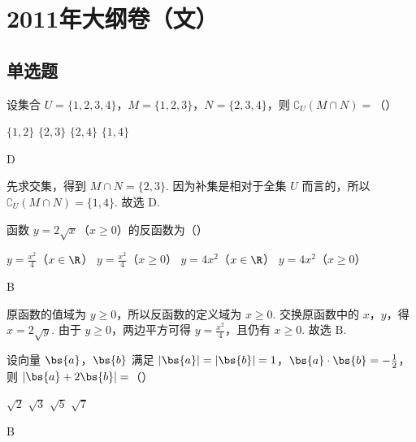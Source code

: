 \chapter{2011年大纲卷（文）}

\section{单选题}

\begin{problem}
设集合 \(U=\{1,2,3,4\}\)，\(M=\{1,2,3\}\)，\(N=\{2,3,4\}\)，则 \(\complement_U(M\cap N)=\)（\quad）

\choices
    {\(\{1,2\}\)}
    {\(\{2,3\}\)}
    {\(\{2,4\}\)}
    {\(\{1,4\}\)}
\end{problem}

\begin{answer}
D
\end{answer}

\begin{solution}
先求交集，得到 \(M\cap N=\{2,3\}\). 因为补集是相对于全集 \(U\) 而言的，所以
\(\complement_U(M\cap N)=\{1,4\}\). 故选 D.
\end{solution}

\begin{problem}
函数 \(y=2\sqrt{x}\)（\(x\geqslant0\)）的反函数为（\quad）

\choices
    {\(y=\frac{x^2}{4}\)（\(x\in\R\)）}
    {\(y=\frac{x^2}{4}\)（\(x\geqslant0\)）}
    {\(y=4x^2\)（\(x\in\R\)）}
    {\(y=4x^2\)（\(x\geqslant0\)）}
\end{problem}

\begin{answer}
B
\end{answer}

\begin{solution}
原函数的值域为 \(y\geqslant0\)，所以反函数的定义域为 \(x\geqslant0\). 交换原函数中的 \(x\)，\(y\)，得 \(x=2\sqrt{y}\). 由于 \(y\geqslant0\)，两边平方可得 \(y=\frac{x^2}{4}\)，且仍有 \(x\geqslant0\). 故选 B.
\end{solution}

\begin{problem}
设向量 \(\bs{a}\)，\(\bs{b}\) 满足 \(|\bs{a}|=|\bs{b}|=1\)，\(\bs{a}\cdot\bs{b}=-\frac{1}{2}\)，则 \(|\bs{a}+2\bs{b}|=\)（\quad）

\choices
    {\(\sqrt{2}\)}
    {\(\sqrt{3}\)}
    {\(\sqrt{5}\)}
    {\(\sqrt{7}\)}
\end{problem}

\begin{answer}
B
\end{answer}

